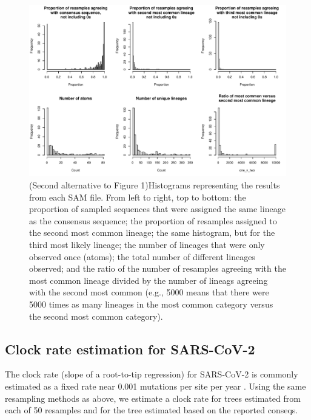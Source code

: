 \documentclass[10pt]{article}
\begin{document}
\begin{figure}
\includegraphics[width=\textwidth]{figs/histograms.pdf}
\caption{\label{fig:covidcalls}(Second alternative to Figure 1)Histograms representing the results from each SAM file. From left to right, top to bottom: the proportion of sampled sequences that were assigned the same lineage as the consensus sequence; the proportion of resamples assigned to the second most common lineage; the same histogram, but for the third most likely lineage; the number of lineages that were only observed once (atoms); the total number of different lineages observed; and the ratio of the number of resamples agreeing with the most common lineage divided by the number of lineags agreeing with the second most common (e.g., 5000 means that there were 5000 times as many lineages in the most common category versus the second most common category).}
\end{figure}



\subsection{Clock rate estimation for SARS-CoV-2}

The clock rate (slope of a root-to-tip regression) for SARS-CoV-2 is commonly estimated as a fixed rate near 0.001 mutations per site per year \citep{ducheneTemporalSignalPhylodynamic2020, choudharySevereAcuteRespiratory2021, songGenomicEpidemiologySARSCoV22021, niePhylogeneticPhylodynamicAnalyses2020, geidelbergGenomicEpidemiologyDensely2021}.
Using the same resampling methods as above, we estimate a clock rate for trees estimated from each of 50 resamples and for the tree estimated based on the reported conseqs.
\end{document}
